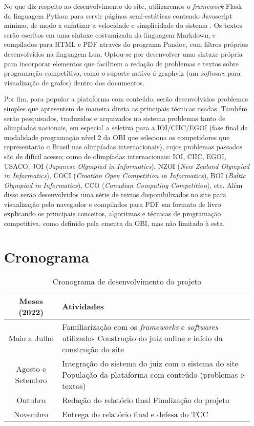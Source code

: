\documentclass[oneside,12pt,article,a4paper,english,brazil]{abntex2}
\begin{document}
No que diz respeito ao desenvolvimento do site, utilizaremos o \emph{framework} Flask da linguagem Python para servir páginas semi-estáticas contendo Javascript mínimo, de modo a enfatizar a velocidade e simplicidade do sistema \cite{drew-flask}. Os textos serão escritos em uma sintaxe costumizada da linguagem Markdown, e compilados para HTML e PDF através do programa Pandoc, com filtros próprios desenvolvidos na linguagem Lua. Optou-se por desenvolver uma sintaxe própria para incorporar elementos que facilitem a redação de problemas e textos sobre programação competitiva, como o suporte nativo à graphviz (um \emph{software} para visualização de grafos) dentro dos documentos.

Por fim, para popular a plataforma com conteúdo, serão desenvolvidos problemas simples que apresentem de maneira direta as principais técnicas usadas. Também serão pesquisados, traduzidos e arquivados no sistema problemas tanto de olimpíadas nacionais, em especial a seletiva para a IOI/CIIC/EGOI (fase final da modalidade programação nível 2 da OBI que seleciona os competidores que representarão o Brasil nas olimpíadas internacionais), cujos problemas passados são de difícil acesso; como de olimpíadas internacionais: IOI, CIIC, EGOI, USACO, JOI (\emph{Japanese Olympiad in Informatics}), NZOI (\emph{New Zealand Olympiad in Informatics}), COCI (\emph{Croatian Open Competition in Informatics}), BOI (\emph{Baltic Olympiad in Informatics}), CCO (\emph{Canadian Computing Competition}), etc. Além disso serão desenvolvidos uma série de textos disponibilizados no site para visualização pelo navegador e compilados para PDF em formato de livro explicando os principais conceitos, algoritmos e técnicas de programação competitiva, como definido pela ementa da OBI, mas não limitado à esta.

\section{Cronograma}

\begin{table}[htb]
  \centering
  \caption{Cronograma de desenvolvimento do projeto}
  \begin{tabularx}{\textwidth}{|c|X|}
    \hline
    \textbf{Meses (2022)} & \textbf{Atividades} \\
    \hline
    Maio a Julho &
    Familiarização com os \emph{frameworks} e \emph{softwares} utilizados \newline
    Construção do juiz online e início da construção do site \\
    \hline
    Agosto e Setembro &
    Integração do sistema do juiz com o sistema do site \newline
    População da plataforma com conteúdo (problemas e textos) \\
    \hline
    Outubro &
    Redação do relatório final \newline
    Finalização do projeto \\
    \hline
    Novembro & Entrega do relatório final e defesa do TCC \\
    \hline
  \end{tabularx}
\end{table}
\end{document}
